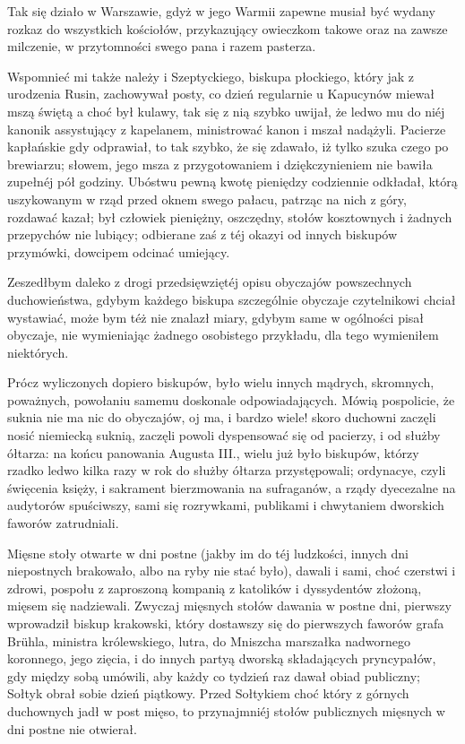 \documentclass{book}
\begin{document}
Tak się działo w Warszawie, gdyż w jego Warmii zapewne musiał być wydany rozkaz do wszystkich kościołów, przykazujący owieczkom takowe oraz na zawsze milczenie, w przytomności swego pana i razem pasterza.

Wspomnieć mi także należy i Szeptyckiego, biskupa płockiego, który jak z urodzenia Rusin, zachowywał posty, co dzień regularnie u Kapucynów miewał mszą świętą a choć był kulawy, tak się z nią szybko uwijał, że ledwo mu do niéj kanonik assystujący z kapelanem, ministrować kanon i mszał nadążyli. Pacierze kapłańskie gdy odprawiał, to tak szybko, że się zdawało, iż tylko szuka czego po brewiarzu; słowem, jego msza z przygotowaniem i dziękczynieniem nie bawiła zupełnéj pół godziny. Ubóstwu pewną kwotę pieniędzy codziennie odkładał, którą uszykowanym w rząd przed oknem swego pałacu, patrząc na nich z góry, rozdawać kazał; był człowiek pieniężny, oszczędny, stołów kosztownych i żadnych przepychów nie lubiący; odbierane zaś z téj okazyi od innych biskupów przymówki, dowcipem odcinać umiejący.

Zeszedłbym daleko z drogi przedsięwziętéj opisu obyczajów powszechnych duchowieństwa, gdybym każdego biskupa szczególnie obyczaje czytelnikowi chciał wystawiać, może bym téż nie znalazł miary, gdybym same w ogólności pisał obyczaje, nie wymieniając żadnego osobistego przykładu, dla tego wymieniłem niektórych.

Prócz wyliczonych dopiero biskupów, było wielu innych mądrych, skromnych, poważnych, powołaniu samemu doskonale odpowiadających. Mówią pospolicie, że suknia nie ma nic do obyczajów, oj ma, i bardzo wiele! skoro duchowni zaczęli nosić niemiecką suknią, zaczęli powoli dyspensować się od pacierzy, i od służby ółtarza: na końcu panowania Augusta III., wielu już było biskupów, którzy rzadko ledwo kilka razy w rok do służby ółtarza przystępowali; ordynacye, czyli święcenia księży, i sakrament bierzmowania na sufraganów, a rządy dyecezalne na audytorów spuściwszy, sami się rozrywkami, publikami i chwytaniem dworskich faworów zatrudniali.

Mięsne stoły otwarte w dni postne (jakby im do téj ludzkości, innych dni niepostnych brakowało, albo na ryby nie stać było), dawali i sami, choć czerstwi i zdrowi, pospołu z zaproszoną kompanią z katolików i dyssydentów złożoną, mięsem się nadziewali. Zwyczaj mięsnych stołów dawania w postne dni, pierwszy wprowadził biskup krakowski, który dostawszy się do pierwszych faworów grafa Brühla, ministra królewskiego, lutra, do Mniszcha marszałka nadwornego koronnego, jego zięcia, i do innych partyą dworską składających pryncypałów, gdy między sobą umówili, aby każdy co tydzień raz dawał obiad publiczny; Sołtyk obrał sobie dzień piątkowy. Przed Sołtykiem choć który z górnych duchownych jadł w post mięso, to przynajmniéj stołów publicznych mięsnych w dni postne nie otwierał.
\end{document}
